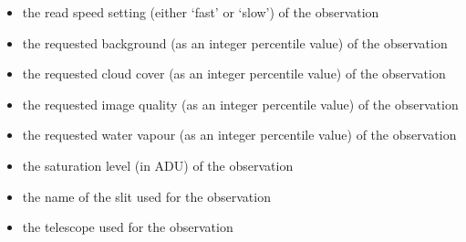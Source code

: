 \documentclass[letterpaper,10pt,english]{sphinxmanual}
\begin{document}
\begin{itemize}
\item {} 
the read speed setting (either `fast' or `slow') of the observation

\end{itemize}

\begin{itemize}
\item {} 
the requested background (as an integer percentile value) of the observation

\end{itemize}

\begin{itemize}
\item {} 
the requested cloud cover (as an integer percentile value) of the observation

\end{itemize}

\begin{itemize}
\item {} 
the requested image quality (as an integer percentile value) of the
observation

\end{itemize}

\begin{itemize}
\item {} 
the requested water vapour (as an integer percentile value) of the
observation

\end{itemize}

\begin{itemize}
\item {} 
the saturation level (in ADU) of the observation

\end{itemize}

\begin{itemize}
\item {} 
the name of the slit used for the observation

\end{itemize}

\begin{itemize}
\item {} 
the telescope used for the observation

\end{itemize}
\end{document}
